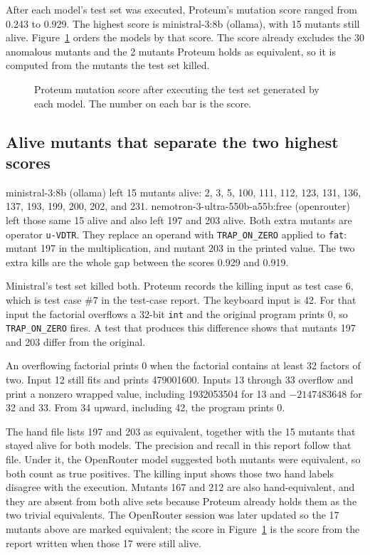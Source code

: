 \documentclass[11pt]{article}
\begin{document}
After each model's test set was executed, Proteum's mutation score ranged from 0.243 to 0.929. The highest score is ministral-3:8b (ollama), with 15 mutants still alive. Figure~\ref{fig:score} orders the models by that score. The score already excludes the 30 anomalous mutants and the 2 mutants Proteum holds as equivalent, so it is computed from the mutants the test set killed.

\begin{figure}[ht]
\centering

\caption{Proteum mutation score after executing the test set generated by each model. The number on each bar is the score.}
\label{fig:score}
\end{figure}

\subsection{Alive mutants that separate the two highest scores}

ministral-3:8b (ollama) left 15 mutants alive: 2, 3, 5, 100, 111, 112, 123, 131, 136, 137, 193, 199, 200, 202, and 231. nemotron-3-ultra-550b-a55b:free (openrouter) left those same 15 alive and also left 197 and 203 alive. Both extra mutants are operator \texttt{u-VDTR}. They replace an operand with \texttt{TRAP\_ON\_ZERO} applied to \texttt{fat}: mutant 197 in the multiplication, and mutant 203 in the printed value. The two extra kills are the whole gap between the scores 0.929 and 0.919.

Ministral's test set killed both. Proteum records the killing input as test case 6, which is test case \#7 in the test-case report. The keyboard input is 42. For that input the factorial overflows a 32-bit \texttt{int} and the original program prints 0, so \texttt{TRAP\_ON\_ZERO} fires. A test that produces this difference shows that mutants 197 and 203 differ from the original.

An overflowing factorial prints 0 when the factorial contains at least 32 factors of two. Input 12 still fits and prints 479001600. Inputs 13 through 33 overflow and print a nonzero wrapped value, including 1932053504 for 13 and $-2147483648$ for 32 and 33. From 34 upward, including 42, the program prints 0.

The hand file lists 197 and 203 as equivalent, together with the 15 mutants that stayed alive for both models. The precision and recall in this report follow that file. Under it, the OpenRouter model suggested both mutants were equivalent, so both count as true positives. The killing input shows those two hand labels disagree with the execution. Mutants 167 and 212 are also hand-equivalent, and they are absent from both alive sets because Proteum already holds them as the two trivial equivalents. The OpenRouter session was later updated so the 17 mutants above are marked equivalent; the score in Figure~\ref{fig:score} is the score from the report written when those 17 were still alive.
\end{document}
